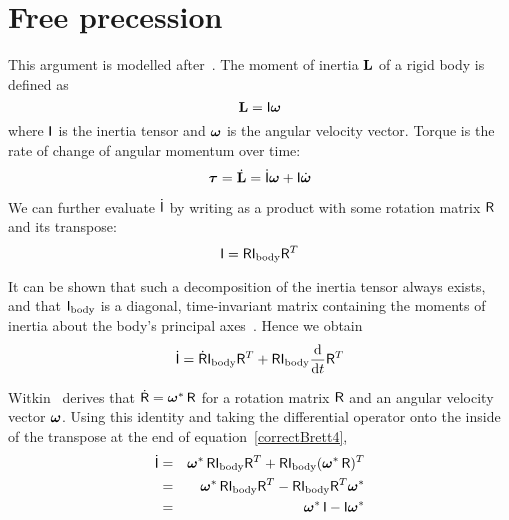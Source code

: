 \section{Free precession\label{correctBrettAppendix}}

This argument is modelled after~\cite{Ruf:02}. The moment of inertia $\ve{L}$ of a rigid
body is defined as
\begin{equation}
\label{correctBrett1}
\ve{L} = \m{I}\ve{\omega}
\end{equation}
where $\mathsf{I}$ is the inertia tensor and $\ve{\omega}$ is the angular velocity vector.
Torque is the rate of change of angular momentum over time:
\begin{equation}
\label{correctBrett2}
\ve{\tau} = \dot{\ve{L}} = \dot{\m{I}}\ve{\omega} + \m{I}\dot{\ve{\omega}}
\end{equation}

We can further evaluate $\dot{\mathsf{I}}$ by writing  as a product with some rotation matrix
$\mathsf{R}$ and its transpose:
\begin{equation}
\label{correctBrett3}
\mathsf{I} = \mathsf{R}\mathsf{I}_\mathrm{body}\mathsf{R}^T
\end{equation}

It can be shown that such a decomposition of the inertia tensor always exists, and that
$\mathsf{I}_\mathrm{body}$ is a diagonal, time-invariant matrix containing the moments
of inertia about the body's principal axes~\cite{Feynman:63}. Hence we obtain
\begin{equation}
\label{correctBrett4}
\dot{\mathsf{I}} = \dot{\mathsf{R}}\mathsf{I}_\mathrm{body}\mathsf{R}^T +
    \mathsf{R}\mathsf{I}_\mathrm{body}\frac{\mathrm{d}}{\mathrm{d} t}\mathsf{R}^T
\end{equation}

Witkin~\cite{BaraffWitkin:97} derives that $\dot{\m{R}} = \dual{\ve{\omega}}\,\m{R}$
for a rotation matrix $\mathsf{R}$ and an angular velocity vector $\ve{\omega}$.
Using this identity and taking the differential operator onto the inside of the
transpose at the end of equation~\ref{correctBrett4},
\begin{eqnarray}
\dot{\m{I}} &=& \dual{\ve{\omega}}\,\m{R}\m{I}_\mathrm{body}\m{R}^T +
    \m{R}\m{I}_\mathrm{body}(\dual{\ve{\omega}}\,\m{R})^T \nonumber\\
&=& \dual{\ve{\omega}}\,\m{R}\m{I}_\mathrm{body}\m{R}^T -
    \m{R}\m{I}_\mathrm{body}\m{R}^T\dual{\ve{\omega}} \nonumber\\
&=& \dual{\ve{\omega}}\,\m{I} - \m{I}\dual{\ve{\omega}} \label{correctBrett5}
\end{eqnarray}

